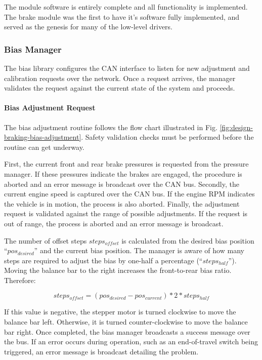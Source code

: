 The module software is entirely complete and all functionality is implemented. The brake module was the first to have it's software fully implemented, and served as the genesis for many of the low-level drivers.

\subsubsection{Bias Manager}

The bias library configures the CAN interface to listen for new adjustment and calibration requests over the network. Once a request arrives, the manager validates the request against the current state of the system and proceeds. 

\paragraph{Bias Adjustment Request}
\label{sec:impl_braking_bar}

The bias adjustment routine follows the flow chart illustrated in Fig. \ref{fig:design-braking-bias-adjustment}. Safety validation checks must be performed before the routine can get underway. 

First, the current front and rear brake pressures is requested from the pressure manager. If these pressures indicate the brakes are engaged, the procedure is aborted and an error message is broadcast over the CAN bus. Secondly, the current engine speed is captured over the CAN bus. If the engine RPM indicates the vehicle is in motion, the process is also aborted. Finally, the adjustment request is validated against the range of possible adjustments. If the request is out of range, the process is aborted and an error message is broadcast.

The number of offset steps $steps_{offset}$ is calculated from the desired bias position ``$pos_{desired}$'' and the current bias position. The manager is aware of how many steps are required to adjust the bias by one-half a percentage (``$steps_{half}$''). Moving the balance bar to the right increases the front-to-rear bias ratio. Therefore:

\[
steps_{offset} = (pos_{desired} - pos_{current}) * 2 * steps_{half}
\]

If this value is negative, the stepper motor is turned clockwise to move the balance bar left. Otherwise, it is turned counter-clockwise to move the balance bar right. Once completed, the bias manager broadcasts a success message over the bus. If an error occurs during operation, such as an end-of-travel switch being triggered, an error message is broadcast detailing the problem. 

